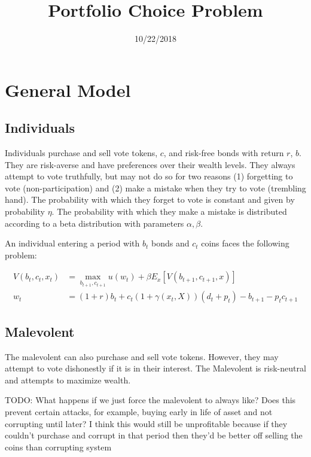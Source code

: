 \documentclass[12pt]{article}
\title{Portfolio Choice Problem}
\author{}
\date{10/22/2018}
\begin{document}
\maketitle


\section{General Model}

\subsection{Individuals}

  Individuals purchase and sell vote tokens, $c$, and risk-free bonds with return $r$, $b$. They are
  risk-averse and have preferences over their wealth levels. They always attempt to vote truthfully,
  but may not do so for two reasons (1) forgetting to vote (non-participation) and (2) make a
  mistake when they try to vote (trembling hand). The probability with which they forget to vote is
  constant and given by probability $\eta$. The probability with which they make a mistake is
  distributed according to a beta distribution with parameters $\alpha, \beta$.

  An individual entering a period with $b_t$ bonds and $c_t$ coins faces the following problem:

  \begin{align}
    V(b_t, c_t, x_t) &= \max_{b_{t+1}, c_{t+1}} u(w_t) + \beta E_x \left[ V(b_{t+1}, c_{t+1}, x) \right] \\
    w_t &= (1 + r) b_t + c_t (1 + \gamma(x_t, X)) (d_t + p_t) - b_{t+1} - p_{t} c_{t+1}
  \end{align}


\subsection{Malevolent}

  The malevolent can also purchase and sell vote tokens. However, they may attempt to vote
  dishonestly if it is in their interest. The Malevolent is risk-neutral and attempts to maximize
  wealth.

  {\color{red} TODO: What happens if we just force the malevolent to always like? Does this prevent
  certain attacks, for example, buying early in life of asset and not corrupting until later? I
  think this would still be unprofitable because if they couldn't purchase and corrupt in that
  period then they'd be better off selling the coins than corrupting system}
\end{document}
